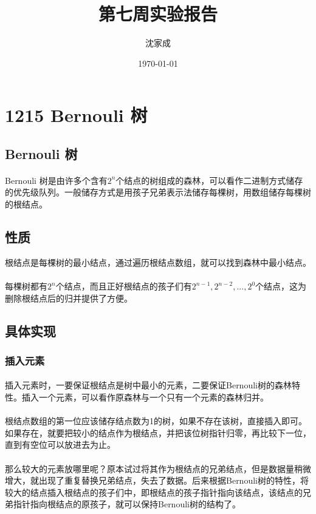 \documentclass[UTF-8, 12pt]{ctexart}
\title{第七周实验报告}
\author{沈家成}
\date{\today}
\begin{document}
\maketitle
\section{1215 Bernouli 树}
    \subsection{Bernouli 树}
    \paragraph{}
    Bernouli 树是由许多个含有$2^n$个结点的树组成的森林，可以看作二进制方式储存的优先级队列。一般储存方式是用孩子兄弟表示法储存每棵树，用数组储存每棵树的根结点。
    \subsection{性质}
    根结点是每棵树的最小结点，通过遍历根结点数组，就可以找到森林中最小结点。
    \paragraph{}
    每棵树都有$2^n$个结点，而且正好根结点的孩子们有$2^{n-1}, 2^{n-2}, ..., 2^0$个结点，这为删除根结点后的归并提供了方便。
    
    \subsection{具体实现}
    	\subsubsection{插入元素}
    \paragraph{}
    插入元素时，一要保证根结点是树中最小的元素，二要保证Bernouli树的森林特性。插入一个元素，可以看作原森林与一个只有一个元素的森林归并。
    \paragraph{}
    根结点数组的第一位应该储存结点数为1的树，如果不存在该树，直接插入即可。如果存在，就要把较小的结点作为根结点，并把该位树指针归零，再比较下一位，直到有空位可以放进去为止。
    \paragraph{}
    那么较大的元素放哪里呢？原本试过将其作为根结点的兄弟结点，但是数据量稍微增大，就出现了重复替换兄弟结点，失去了数据。后来根据Bernouli树的特性，将较大的结点插入根结点的孩子们中，即根结点的孩子指针指向该结点，该结点的兄弟指针指向根结点的原孩子，就可以保持Bernouli树的结构了。
\end{document}
